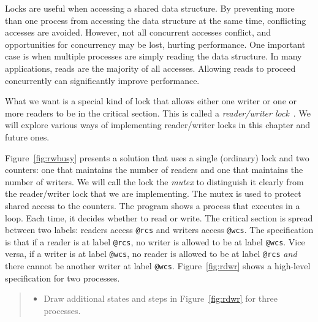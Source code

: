 \documentclass{report}
\begin{document}
Locks are useful when accessing a shared data structure.  By preventing
more than one process from accessing the data structure at the same
time, conflicting accesses are avoided.  However, not all concurrent
accesses conflict, and opportunities for concurrency may be lost,
hurting performance.  One important case is when multiple processes
are simply reading the data structure.
In many applications, reads are the majority of all accesses.
Allowing reads to proceed concurrently can significantly improve performance.

What we want is a special kind of lock that allows either one writer
or one or more readers to be in the critical section.  This is called
a \emph{reader/writer lock}~\cite{CHP71}.
We will explore various ways of implementing reader/writer locks in
this chapter and future ones.

Figure~\ref{fig:rwbusy} presents a solution that uses a
single (ordinary) lock and two counters: one that maintains the number
of readers and one that maintains the number of writers.
We will call the lock the \emph{mutex} to distinguish it clearly from
the reader/writer lock that we are implementing.
The mutex is used to protect shared access to the counters.
The program shows a process that executes in a loop.
Each time, it decides whether to read or write.
The critical section is spread between two labels:
readers access \texttt{@rcs} and writers access \texttt{@wcs}.
The specification is that if a reader is at label \texttt{@rcs},
no writer is allowed to be at label \texttt{@wcs}.  Vice versa, if
a writer is at label \texttt{@wcs}, no reader is allowed to be at
label \texttt{@rcs} \emph{and} there cannot be another writer at
label \texttt{@wcs}.  Figure~\ref{fig:rdwr} shows a high-level
specification for two processes.

\begin{quote}
\begin{itemize}
\item Draw additional states and steps in Figure~\ref{fig:rdwr}
for three processes.
\end{itemize}
\end{quote}
\end{document}
